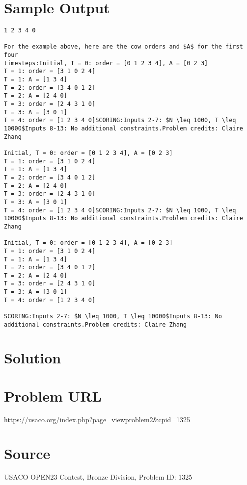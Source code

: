 \documentclass[12pt]{article}
\begin{document}
\section*{Sample Output}
\begin{verbatim}
1 2 3 4 0

For the example above, here are the cow orders and $A$ for the first four
timesteps:Initial, T = 0: order = [0 1 2 3 4], A = [0 2 3]
T = 1: order = [3 1 0 2 4]
T = 1: A = [1 3 4]
T = 2: order = [3 4 0 1 2]
T = 2: A = [2 4 0]
T = 3: order = [2 4 3 1 0]
T = 3: A = [3 0 1]
T = 4: order = [1 2 3 4 0]SCORING:Inputs 2-7: $N \leq 1000, T \leq 10000$Inputs 8-13: No additional constraints.Problem credits: Claire Zhang

Initial, T = 0: order = [0 1 2 3 4], A = [0 2 3]
T = 1: order = [3 1 0 2 4]
T = 1: A = [1 3 4]
T = 2: order = [3 4 0 1 2]
T = 2: A = [2 4 0]
T = 3: order = [2 4 3 1 0]
T = 3: A = [3 0 1]
T = 4: order = [1 2 3 4 0]SCORING:Inputs 2-7: $N \leq 1000, T \leq 10000$Inputs 8-13: No additional constraints.Problem credits: Claire Zhang

Initial, T = 0: order = [0 1 2 3 4], A = [0 2 3]
T = 1: order = [3 1 0 2 4]
T = 1: A = [1 3 4]
T = 2: order = [3 4 0 1 2]
T = 2: A = [2 4 0]
T = 3: order = [2 4 3 1 0]
T = 3: A = [3 0 1]
T = 4: order = [1 2 3 4 0]

SCORING:Inputs 2-7: $N \leq 1000, T \leq 10000$Inputs 8-13: No additional constraints.Problem credits: Claire Zhang
\end{verbatim}

\section*{Solution}


\section*{Problem URL}
https://usaco.org/index.php?page=viewproblem2&cpid=1325

\section*{Source}
USACO OPEN23 Contest, Bronze Division, Problem ID: 1325
\end{document}
